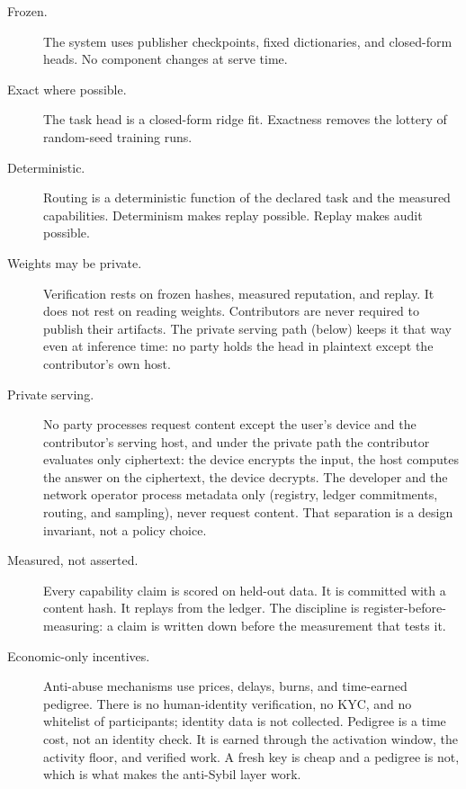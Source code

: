 \documentclass[11pt]{article}
\begin{document}
\begin{description}
    \item[Frozen.] The system uses publisher checkpoints, fixed
          dictionaries, and closed-form heads. No component changes at
          serve time.
    \item[Exact where possible.] The task head is a closed-form ridge
          fit. Exactness removes the lottery of random-seed training runs.
    \item[Deterministic.] Routing is a deterministic function of the
          declared task and the measured capabilities. Determinism makes
          replay possible. Replay makes audit possible.
    \item[Weights may be private.] Verification rests on frozen
          hashes, measured reputation, and replay. It does not rest on
          reading weights. Contributors are never required to publish their
          artifacts. The private serving path (below) keeps it that way even
          at inference time: no party holds the head in plaintext except the
          contributor's own host.
    \item[Private serving.] No party processes request content except
          the user's device and the contributor's serving host, and under
          the private path the contributor evaluates only ciphertext: the
          device encrypts the input, the host computes the answer on the
          ciphertext, the device decrypts. The developer and the network
          operator process metadata only (registry, ledger commitments,
          routing, and sampling), never request content. That separation
          is a design invariant, not a policy choice.
    \item[Measured, not asserted.] Every capability claim is scored
          on held-out data. It is committed with a content hash. It replays
          from the ledger. The discipline is register-before-measuring: a
          claim is written down before the measurement that tests it.
    \item[Economic-only incentives.] Anti-abuse mechanisms use
          prices, delays, burns, and time-earned pedigree. There is no
          human-identity verification, no KYC, and no whitelist of
          participants; identity data is not collected. Pedigree is a
          time cost, not an identity check. It is earned through the
          activation window, the activity floor, and verified work. A
          fresh key is cheap and a
          pedigree is not, which is what makes the anti-Sybil layer work.

\end{description}
\end{document}
